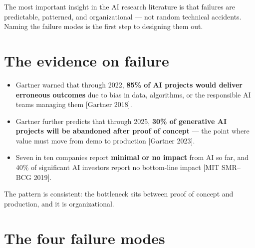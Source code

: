 
The most important insight in the AI research literature is that failures are
predictable, patterned, and organizational — not random technical accidents.
Naming the failure modes is the first step to designing them out.

\section{The evidence on failure}

\begin{itemize}
  \item Gartner warned that through 2022, \textbf{85\% of AI projects would
        deliver erroneous outcomes} due to bias in data, algorithms, or the
        responsible AI teams managing them [Gartner 2018].
  \item Gartner further predicts that through 2025, \textbf{30\% of generative
        AI projects will be abandoned after proof of concept} — the point where
        value must move from demo to production [Gartner 2023].
  \item Seven in ten companies report \textbf{minimal or no impact} from AI so
        far, and 40\% of significant AI investors report no bottom-line impact
        [MIT SMR--BCG 2019].
\end{itemize}

The pattern is consistent: the bottleneck sits between proof of concept and
production, and it is organizational.

\section{The four failure modes}

